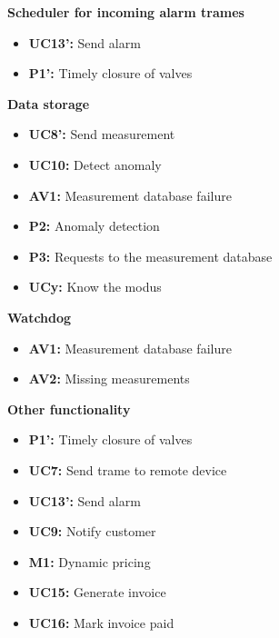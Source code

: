 \textbf{Scheduler for incoming alarm trames}
\begin{itemize}
	\item \textbf{UC13': } Send alarm
	\item \textbf{P1': } Timely closure of valves
\end{itemize}

\textbf{Data storage}
\begin{itemize}
	\item \textbf{UC8': } Send measurement
	\item \textbf{UC10: } Detect anomaly
	\item \textbf{AV1: } Measurement database failure
	\item \textbf{P2: } Anomaly detection
	\item \textbf{P3: } Requests to the measurement database
	\item \textbf{UCy: } Know the modus
\end{itemize}

\textbf{Watchdog}
\begin{itemize}
	\item \textbf{AV1: } Measurement database failure
	\item \textbf{AV2: } Missing measurements
\end{itemize}



\textbf{Other functionality}
\begin{itemize}
	\item \textbf{P1': } Timely closure of valves
	\item \textbf{UC7: } Send trame to remote device
	\item \textbf{UC13': } Send alarm
	\item \textbf{UC9: } Notify customer
	\item \textbf{M1: } Dynamic pricing
	\item \textbf{UC15: } Generate invoice
	\item \textbf{UC16: } Mark invoice paid
\end{itemize}

